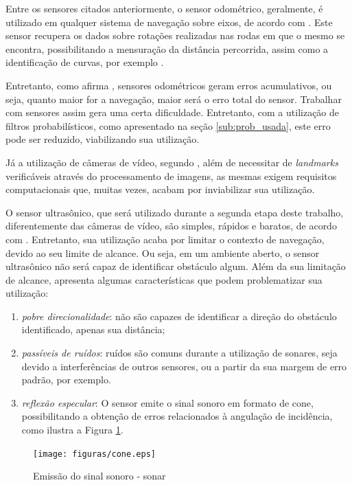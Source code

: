 			Entre os sensores citados anteriormente, o sensor odométrico, geralmente, é utilizado em qualquer sistema de navegação sobre eixos, de acordo com \cite{explore_marte}. Este sensor recupera os dados sobre rotações realizadas nas rodas em que o mesmo se encontra, possibilitando a mensuração da distância percorrida, assim como a identificação de curvas, por exemplo \cite{ROB:1764504}. 

			Entretanto, como afirma \cite{iterated_Dslam}, sensores odométricos geram erros acumulativos, ou seja, quanto maior for a navegação, maior será o erro total do sensor. Trabalhar com sensores assim gera uma certa dificuldade. Entretanto, com a utilização de filtros probabilísticos, como apresentado na seção \ref{sub:prob_usada}, este erro pode ser reduzido, viabilizando sua utilização.

			Já a utilização de câmeras de vídeo, segundo \cite{agenteExploratorioKalman}, além de necessitar de \textit{landmarks} verificáveis através do processamento de imagens, as mesmas exigem requisitos computacionais que, muitas vezes, acabam por inviabilizar sua utilização.

			O sensor ultrasônico, que será utilizado durante a segunda etapa deste trabalho, diferentemente das câmeras de vídeo, são simples, rápidos e baratos, de acordo com \cite{agenteExploratorioKalman}. Entretanto, sua utilização acaba por limitar o contexto de navegação, devido ao seu limite de alcance. Ou seja, em um ambiente aberto, o sensor ultrasônico não será capaz de identificar obstáculo algum. Além da sua limitação de alcance, \cite{agenteExploratorioKalman} apresenta algumas características que podem problematizar sua utilização:

			\begin{enumerate}
				\item \textit{pobre direcionalidade}: não são capazes de identificar a direção do obstáculo identificado, apenas sua distância;
				\item \textit{passíveis de ruídos}: ruídos são comuns durante a utilização de sonares, seja devido a interferências de outros sensores, ou a partir da sua margem de erro padrão, por exemplo.
				\item \textit{reflexão especular}: O sensor emite o sinal sonoro em formato de cone, possibilitando a obtenção de erros relacionados à angulação de incidência, como ilustra a Figura \ref{img:cone}. 
			\end{enumerate}

			\begin{figure}[H]
				\centering
				\texttt{[image: figuras/cone.eps]}
				\caption[Emissão do sinal sonoro - sonar]{Emissão do sinal sonoro - sonar}
				\label{img:cone}
			\end{figure}

